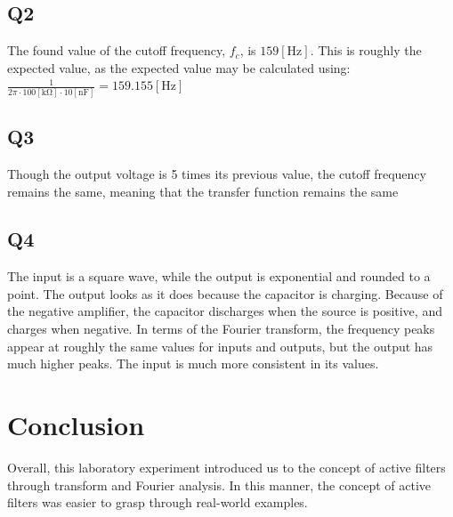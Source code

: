 \documentclass[
	letterpaper, %
	10pt, %
]{CSUniSchoolLabReport}
\begin{document}
  \subsection{Q2} The found value of the cutoff frequency, $f_c$, is $159[\si{\hertz}]$. This is roughly the expected value, as the expected value may be calculated using: $\frac{1}{2\pi\cdot 100[\si{\kilo\ohm}]\cdot10[\si{\nano\farad}]}=159.155[\si{\hertz}]$

  \subsection{Q3} Though the output voltage is 5 times its previous value, the cutoff frequency remains the same, meaning that the transfer function remains the same

  \subsection{Q4} The input is a square wave, while the output is exponential and rounded to a point. The output looks as it does because the capacitor is charging. Because of the negative amplifier, the capacitor discharges when the source is positive, and charges when negative. In terms of the Fourier transform, the frequency peaks appear at roughly the same values for inputs and outputs, but the output has much higher peaks. The input is much more consistent in its values.

\section{Conclusion}

Overall, this laboratory experiment introduced us to the concept of active filters through transform and Fourier analysis. In this manner, the concept of active filters was easier to grasp through real-world examples.
\end{document}
